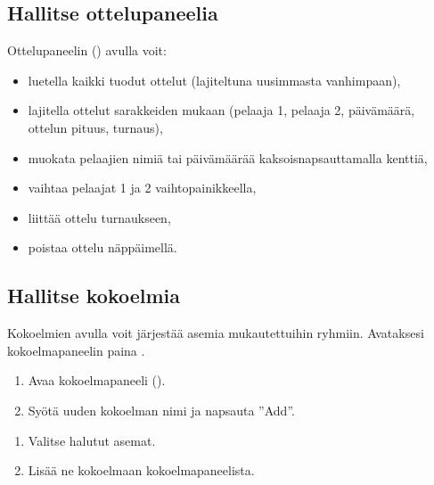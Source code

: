 \documentclass[letterpaper,10pt,finnish]{sphinxmanual}
\begin{document}
\subsection{Hallitse ottelupaneelia}
\label{\detokenize{guide_utilisateur:gerer-le-panneau-des-matchs}}
\sphinxAtStartPar
Ottelupaneelin () avulla voit:
\begin{itemize}
\item {} 
\sphinxAtStartPar
luetella kaikki tuodut ottelut (lajiteltuna uusimmasta vanhimpaan),

\item {} 
\sphinxAtStartPar
lajitella ottelut sarakkeiden mukaan (pelaaja 1, pelaaja 2, päivämäärä, ottelun pituus, turnaus),

\item {} 
\sphinxAtStartPar
muokata pelaajien nimiä tai päivämäärää kaksoisnapsauttamalla kenttiä,

\item {} 
\sphinxAtStartPar
vaihtaa pelaajat 1 ja 2 vaihtopainikkeella,

\item {} 
\sphinxAtStartPar
liittää ottelu turnaukseen,

\item {} 
\sphinxAtStartPar
poistaa ottelu \sphinxhyphen{}näppäimellä.

\end{itemize}


\subsection{Hallitse kokoelmia}
\label{\detokenize{guide_utilisateur:gerer-les-collections}}
\sphinxAtStartPar
Kokoelmien avulla voit järjestää asemia mukautettuihin ryhmiin. Avataksesi kokoelmapaneelin paina .

\sphinxAtStartPar
{}
\begin{enumerate}
%
\item {} 
\sphinxAtStartPar
Avaa kokoelmapaneeli ().

\item {} 
\sphinxAtStartPar
Syötä uuden kokoelman nimi ja napsauta ”Add”.

\end{enumerate}

\sphinxAtStartPar
{}
\begin{enumerate}
%
\item {} 
\sphinxAtStartPar
Valitse halutut asemat.

\item {} 
\sphinxAtStartPar
Lisää ne kokoelmaan kokoelmapaneelista.

\end{enumerate}
\end{document}
